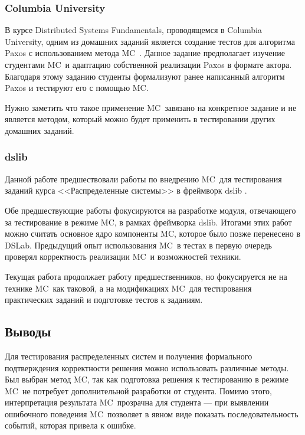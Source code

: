 \documentclass[a4paper,12pt]{extarticle}
\newcommand{\mc}[0]{MC}
\begin{document}
\subsubsection{Columbia University}

В курсе Distributed Systems Fundamentals, проводящемся в Columbia University, одним из домашних заданий является создание тестов для алгоритма Paxos с использованием метода \mc\ \cite{b20}.
Данное задание предполагает изучение студентами \mc\ и адаптацию собственной реализации Paxos в формате актора.
Благодаря этому заданию студенты формализуют ранее написанный алгоритм Paxos и тестируют его с помощью \mc.

Нужно заметить что такое применение \mc\ завязано на конкретное задание и не является методом, который можно будет применить в тестировании других домашних заданий.

\subsubsection{dslib}

Данной работе предшествовали работы по внедрению \mc\ для тестирования заданий курса <<Распределенные системы>> в фреймворк dslib \cite{b10,b32}.

Обе предшествующие работы фокусируются на разработке модуля, отвечающего за тестирование в режиме \mc, в рамках фреймворка dslib.
Итогами этих работ можно считать основное ядро компоненты \mc, которое было позже перенесено в DSLab.
Предыдущий опыт использования \mc\ в тестах в первую очередь проверял корректность реализации \mc\ и возможностей техники.

Текущая работа продолжает работу предшественников, но фокусируется не на технике \mc\ как таковой, а на модификациях \mc\ для тестирования практических заданий и подготовке тестов к заданиям.


\subsection{Выводы}

Для тестирования распределенных систем и получения формального подтверждения корректности решения можно использовать различные методы.
Был выбран метод \mc, так как подготовка решения к тестированию в режиме \mc\ не потребует дополнительной разработки от студента.
Помимо этого, интерпретация результата \mc\ прозрачна для студента --- при выявлении ошибочного поведения \mc\ позволяет в явном виде показать последовательность событий, которая привела к ошибке.
\end{document}
